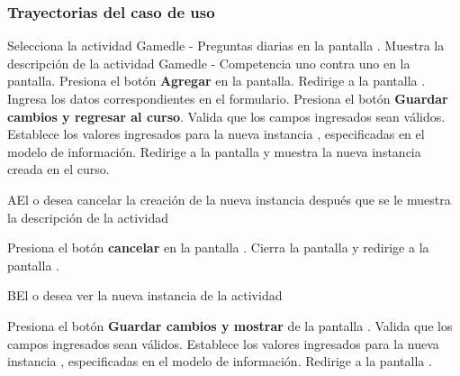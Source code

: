 \subsubsection{Trayectorias del caso de uso}

\begin{UCtrayectoria}%
%
    \Actor Selecciona la actividad Gamedle - Preguntas diarias en la pantalla .
    \Sistema Muestra la descripción de la actividad Gamedle - Competencia uno contra uno en la pantalla.
    \Actor Presiona el botón {\bf Agregar} en la pantalla. 
    \Sistema Redirige a la pantalla .
    \label{CU-C01-muestra-pantalla}
    \Actor Ingresa los datos correspondientes en el formulario.
    \Actor Presiona el botón {\bf Guardar cambios y regresar al curso}. 
    \Sistema Valida que los campos ingresados sean válidos.  
    \Sistema Establece los valores ingresados para la nueva instancia , especificadas en el modelo de información.
    \Sistema Redirige a la pantalla  y muestra la nueva instancia creada en el curso.

\end{UCtrayectoria}

\begin{UCtrayectoriaA}%
  {A}{El  o  desea cancelar la creación de la nueva instancia después que se le muestra la descripción de la actividad}

  \Actor Presiona el botón {\bf cancelar} en la pantalla .
  \Sistema Cierra la pantalla  y redirige a la pantalla .

\end{UCtrayectoriaA}

\begin{UCtrayectoriaA}{B}{El  o  desea ver la nueva instancia de la actividad}

    \Actor Presiona el botón {\bf Guardar cambios y mostrar} de la pantalla .
    \Sistema Valida que los campos ingresados sean válidos.  
    \Sistema Establece los valores ingresados para la nueva instancia , especificadas en el modelo de información.
    \Sistema Redirige a la pantalla .

\end{UCtrayectoriaA}

